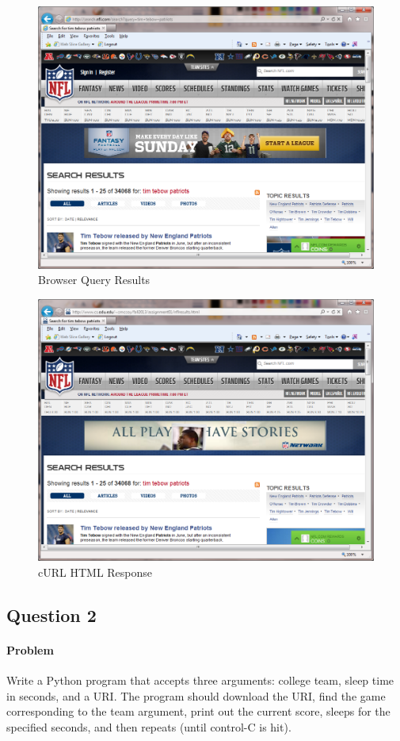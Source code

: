 \documentclass[letterpaper,11pt]{report}
\begin{document}
\begin{savenotes}
\begin{figure}[htb]
	\centering
		\includegraphics[width=.90\textwidth]{BrowserQuery.png}
	\caption{Browser Query Results}
	\label{fig:BrowserQuery}
\end{figure}

\begin{figure}[htb]
	\centering
		\includegraphics[width=.90\textwidth]{CURLQuery.png}
	\caption{cURL HTML Response}
	\label{fig:CURLQuery}
\end{figure}


\subsection{Question 2}
\paragraph{Problem} Write a Python program that accepts three arguments: college team, sleep time in seconds, and a URI. The program should download the URI, find the game corresponding to the team argument, print out the current score, sleeps for the specified seconds, and then repeats (until control-C is hit).

\end{savenotes}
\end{document}
